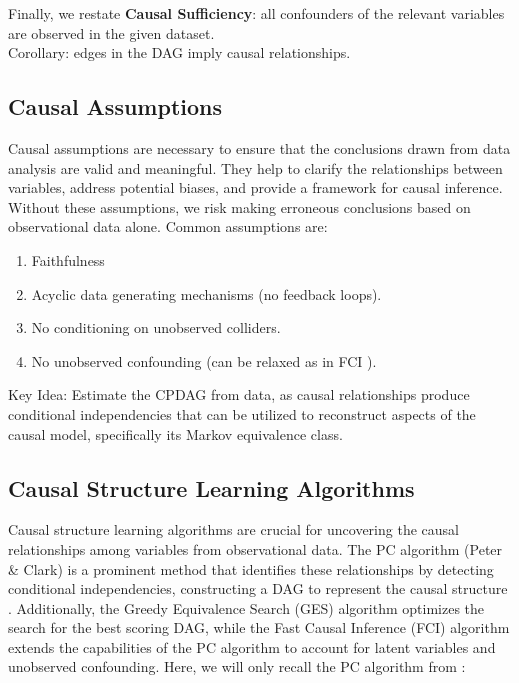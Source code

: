 \documentclass{article}
\begin{document}
	Finally, we restate \textbf{Causal Sufficiency}: all confounders of the relevant variables are observed in the given dataset. \\
	
	Corollary: edges in the DAG imply causal relationships.
	
	\subsection{Causal Assumptions}
	
	Causal assumptions are necessary to ensure that the conclusions drawn from data analysis are valid and meaningful. They help to clarify the relationships between variables, address potential biases, and provide a framework for causal inference. Without these assumptions, we risk making erroneous conclusions based on observational data alone. Common assumptions are:
	
	\begin{enumerate}
		\item Faithfulness
		\item Acyclic data generating mechanisms (no feedback loops).
		\item No conditioning on unobserved colliders.
		\item No unobserved confounding (can be relaxed as in FCI \cite{fci2001}).
	\end{enumerate}
	
	Key Idea: Estimate the CPDAG from data, as causal relationships produce conditional independencies that can be utilized to reconstruct aspects of the causal model, specifically its Markov equivalence class.
	
	\subsection{Causal Structure Learning Algorithms}
	
	Causal structure learning algorithms are crucial for uncovering the causal relationships among variables from observational data. The PC algorithm (Peter \& Clark) is a prominent method that identifies these relationships by detecting conditional independencies, constructing a DAG to represent the causal structure \cite{pc1991}. Additionally, the Greedy Equivalence Search (GES) algorithm \cite{ges2024} optimizes the search for the best scoring DAG, while the Fast Causal Inference (FCI) algorithm \cite{fci2001} extends the capabilities of the PC algorithm to account for latent variables and unobserved confounding. Here, we will only recall the PC algorithm from \cite{pc1991}:
	
\end{document}

